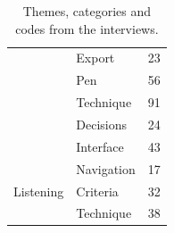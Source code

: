 \begin{table}[h]
{\begin{tabular}{|l|l|l|}
& Export & 23 \\ \cline{2-3} %
& Pen & 56 \\ \cline{2-3} %
& Technique & 91 \\ \cline{2-3} %
& Decisions & 24 \\ \cline{2-3} %
 & Interface & 43 \\ \hline %
\multirow{3}{*}{Listening}
& Navigation & 17 \\ \cline{2-3} %
& Criteria & 32 \\ \cline{2-3} %
 & Technique & 38 \\ \hline %

\end{tabular}
}
\caption{Themes, categories and codes from the interviews.}
\label{tab:paper-codes}
\end{table}

